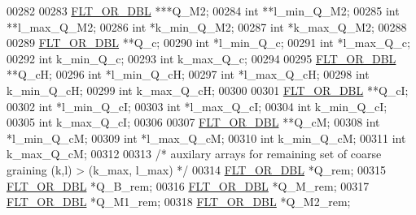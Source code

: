 \begin{DoxyCode}
00282 
00283       \hyperlink{group__data__structures_ga31125aeace516926bf7f251f759b6126}{FLT\_OR\_DBL}      ***Q\_M2;
00284       \textcolor{keywordtype}{int}             **l\_min\_Q\_M2;
00285       \textcolor{keywordtype}{int}             **l\_max\_Q\_M2;
00286       \textcolor{keywordtype}{int}             *k\_min\_Q\_M2;
00287       \textcolor{keywordtype}{int}             *k\_max\_Q\_M2;
00288 
00289       \hyperlink{group__data__structures_ga31125aeace516926bf7f251f759b6126}{FLT\_OR\_DBL}      **Q\_c;
00290       \textcolor{keywordtype}{int}             *l\_min\_Q\_c;
00291       \textcolor{keywordtype}{int}             *l\_max\_Q\_c;
00292       \textcolor{keywordtype}{int}             k\_min\_Q\_c;
00293       \textcolor{keywordtype}{int}             k\_max\_Q\_c;
00294 
00295       \hyperlink{group__data__structures_ga31125aeace516926bf7f251f759b6126}{FLT\_OR\_DBL}      **Q\_cH;
00296       \textcolor{keywordtype}{int}             *l\_min\_Q\_cH;
00297       \textcolor{keywordtype}{int}             *l\_max\_Q\_cH;
00298       \textcolor{keywordtype}{int}             k\_min\_Q\_cH;
00299       \textcolor{keywordtype}{int}             k\_max\_Q\_cH;
00300 
00301       \hyperlink{group__data__structures_ga31125aeace516926bf7f251f759b6126}{FLT\_OR\_DBL}      **Q\_cI;
00302       \textcolor{keywordtype}{int}             *l\_min\_Q\_cI;
00303       \textcolor{keywordtype}{int}             *l\_max\_Q\_cI;
00304       \textcolor{keywordtype}{int}             k\_min\_Q\_cI;
00305       \textcolor{keywordtype}{int}             k\_max\_Q\_cI;
00306 
00307       \hyperlink{group__data__structures_ga31125aeace516926bf7f251f759b6126}{FLT\_OR\_DBL}      **Q\_cM;
00308       \textcolor{keywordtype}{int}             *l\_min\_Q\_cM;
00309       \textcolor{keywordtype}{int}             *l\_max\_Q\_cM;
00310       \textcolor{keywordtype}{int}             k\_min\_Q\_cM;
00311       \textcolor{keywordtype}{int}             k\_max\_Q\_cM;
00312 
00313       \textcolor{comment}{/* auxilary arrays for remaining set of coarse graining (k,l) > (k\_max, l\_max) */}
00314       \hyperlink{group__data__structures_ga31125aeace516926bf7f251f759b6126}{FLT\_OR\_DBL}      *Q\_rem;
00315       \hyperlink{group__data__structures_ga31125aeace516926bf7f251f759b6126}{FLT\_OR\_DBL}      *Q\_B\_rem;
00316       \hyperlink{group__data__structures_ga31125aeace516926bf7f251f759b6126}{FLT\_OR\_DBL}      *Q\_M\_rem;
00317       \hyperlink{group__data__structures_ga31125aeace516926bf7f251f759b6126}{FLT\_OR\_DBL}      *Q\_M1\_rem;
00318       \hyperlink{group__data__structures_ga31125aeace516926bf7f251f759b6126}{FLT\_OR\_DBL}      *Q\_M2\_rem;

\end{DoxyCode}
